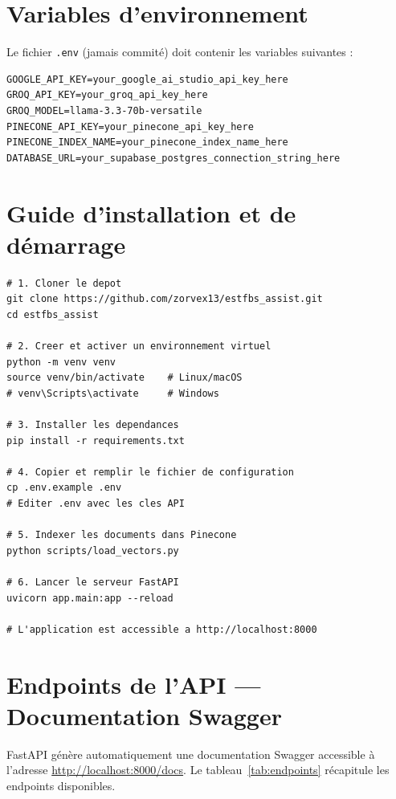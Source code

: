 \documentclass[12pt, a4paper, twoside]{report}
\newcommand{\file}[1]{\texttt{\footnotesize #1}}
\begin{document}
\chapter{Variables d'environnement}

Le fichier \file{.env} (jamais commité) doit contenir les variables suivantes :

\begin{lstlisting}[language={}, caption={Contenu du fichier .env.example}, label={lst:env}]
GOOGLE_API_KEY=your_google_ai_studio_api_key_here
GROQ_API_KEY=your_groq_api_key_here
GROQ_MODEL=llama-3.3-70b-versatile
PINECONE_API_KEY=your_pinecone_api_key_here
PINECONE_INDEX_NAME=your_pinecone_index_name_here
DATABASE_URL=your_supabase_postgres_connection_string_here
\end{lstlisting}

\chapter{Guide d'installation et de démarrage}

\begin{lstlisting}[language={}, caption={Commandes d'installation}, label={lst:install}]
# 1. Cloner le depot
git clone https://github.com/zorvex13/estfbs_assist.git
cd estfbs_assist

# 2. Creer et activer un environnement virtuel
python -m venv venv
source venv/bin/activate    # Linux/macOS
# venv\Scripts\activate     # Windows

# 3. Installer les dependances
pip install -r requirements.txt

# 4. Copier et remplir le fichier de configuration
cp .env.example .env
# Editer .env avec les cles API

# 5. Indexer les documents dans Pinecone
python scripts/load_vectors.py

# 6. Lancer le serveur FastAPI
uvicorn app.main:app --reload

# L'application est accessible a http://localhost:8000
\end{lstlisting}

\chapter{Endpoints de l'API --- Documentation Swagger}

FastAPI génère automatiquement une documentation Swagger accessible à l'adresse \url{http://localhost:8000/docs}. Le tableau~\ref{tab:endpoints} récapitule les endpoints disponibles.
\end{document}
